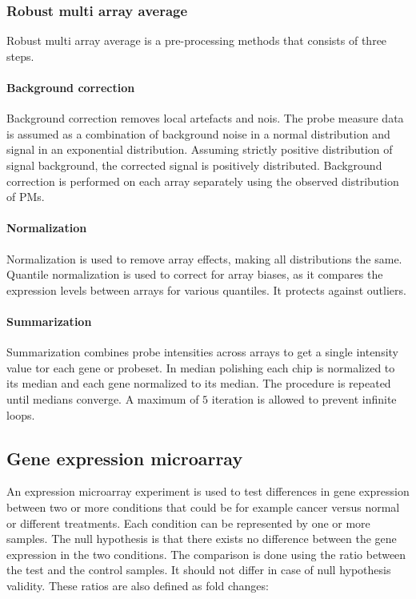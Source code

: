 		\subsubsection{Robust multi array average}
		Robust multi array average is a pre-processing methods that consists of three steps.

			\paragraph{Background correction}
			Background correction removes local artefacts and nois.
			The probe measure data is assumed as a combination of background noise in a normal distribution and signal in an exponential distribution.
			Assuming strictly positive distribution of signal background, the corrected signal is positively distributed.
			Background correction is performed on each array separately using the observed distribution of PMs.

			\paragraph{Normalization}
			Normalization is used to remove array effects, making all distributions the same.
			Quantile normalization is used to correct for array biases, as it compares the expression levels between arrays for various quantiles.
			It protects against outliers.

			\paragraph{Summarization}
			Summarization combines probe intensities across arrays to get a single intensity value tor each gene or probeset.
			In median polishing each chip is normalized to its median and each gene normalized to its median.
			The procedure is repeated until medians converge.
			A maximum of $5$ iteration is allowed to prevent infinite loops.

	\subsection{Gene expression microarray}
	An expression microarray experiment is used to test differences in gene expression between two or more conditions that could be for example cancer versus normal or different treatments.
	Each condition can be represented by one or more samples.
	The null hypothesis is that there exists no difference between the gene expression in the two conditions.
	The comparison is done using the ratio between the test and the control samples.
	It should not differ in case of null hypothesis validity.
	These ratios are also defined as fold changes:

